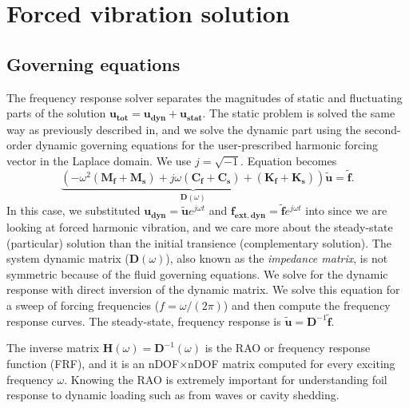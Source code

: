 \documentclass[10pt]{article}
\newcommand{\mbf}[1]{\mathbf{#1}}
\newcommand{\be}{\begin{eqnarray}}
\newcommand{\ee}{\end{eqnarray}}
\begin{document}
\section{Forced vibration solution}
\subsection{Governing equations}
The {frequency response solver} separates the magnitudes of static and fluctuating parts of the solution
%
$\mbf{u_{tot}}= \mbf{{u}_{dyn}} + \mbf{u_{stat}}$.
%
The static problem is solved the same way as previously described in, and we solve the dynamic part using the second-order dynamic governing equations for the user-prescribed harmonic forcing vector in the Laplace domain.
We use $j = \sqrt{-1}$.
Equation becomes
\begin{equation}
    \label{eqn:dyn}
    \underbrace{
        \left(-\omega^2  \left(\mbf{M_f + M_s}  \right) +
        j\omega    \left(\mbf{C_f +C_s}\right) + \left(\mbf{K_f + K_s}\right) \right)
    }_{\mbf{D}(\omega)}
    \mbf{\tilde{u}}
    = \mbf{\tilde{f}}.
\end{equation}
%
In this case, we substituted $\mbf{u_{dyn}} =\mbf{\tilde{u}}e^{j \omega  t}$ and $\mbf{f_{ext,dyn}} = \mbf{\tilde{f}}e^{j \omega t}$ into  since we are looking at forced harmonic vibration, and we care more about the steady-state (particular) solution than the initial transience (complementary solution).
The system dynamic matrix ($\mbf{D}(\omega)$), also known as the \emph{impedance matrix}, is not symmetric because of the fluid governing equations.
We solve for the dynamic response with direct inversion of the dynamic matrix.
We solve this equation for a sweep of forcing frequencies ($f = \omega/(2 \pi)$) and then compute the frequency response curves.
The steady-state, frequency response is $\mbf{\tilde{u}} = \mbf{D}^{-1}\mbf{\tilde{f}}$.

The inverse matrix $\mbf{H}(\omega) = \mbf{D}^{-1}(\omega)$ is the RAO or frequency response function (FRF), and it is an nDOF$\times$nDOF matrix computed for every exciting frequency $\omega$.
Knowing the RAO is extremely important for understanding foil response to dynamic loading such as from waves or cavity shedding.
\end{document}
